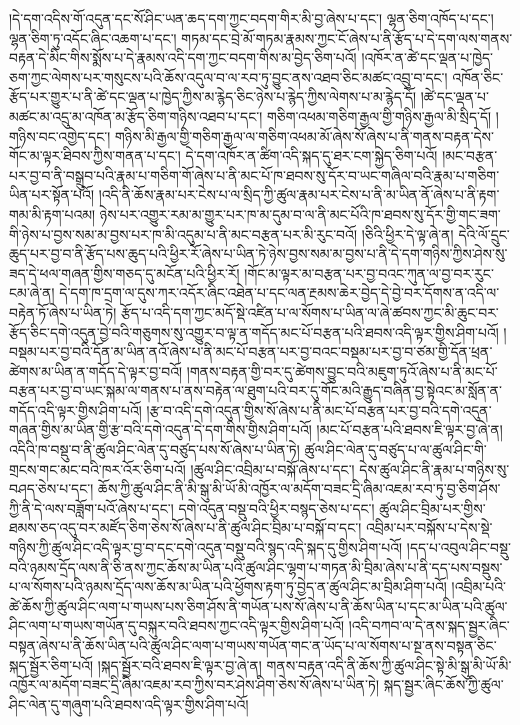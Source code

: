 །དེ་དག་འདིས་གོ་འདུན་དང་སོ་ཤིང་ཡན་ཆད་དག་ཀྱང་བདག་གིར་མི་བྱ་ཞེས་པ་དང་། ལྷན་ཅིག་འཁོད་པ་དང་། ལྷན་ཅིག་ཏུ་འདོང་ཞིང་འཆག་པ་དང་། གཏམ་དང་བྲེ་མོ་གཏམ་རྣམས་ཀྱང་ངོ་ཞེས་པ་ནི་རྩོད་པ་དེ་དག་ལས་གནས་བརྟན་དེ་མིང་གིས་སྨོས་པ་དེ་རྣམས་འདི་དག་ཀྱང་བདག་གིས་མ་བྱེད་ཅིག་པའོ། །འཁོར་ན་ཚེ་དང་ལྡན་པ་ཁྱེད་ཅག་ཀྱང་ལེགས་པར་གསུངས་པའི་ཆོས་འདུལ་བ་ལ་རབ་ཏུ་བྱུང་ནས་འཐབ་ཅིང་མཚང་འབྲུ་བ་དང་། འཁོན་ཅིང་རྩོད་པར་གྱུར་པ་ནི་ཚེ་དང་ལྡན་པ་ཁྱེད་ཀྱིས་མ་རྙེད་ཅིང་ཉེས་པ་རྙེད་ཀྱིས་ལེགས་པ་མ་རྙེད་དོ། །ཚེ་དང་ལྡན་པ་མཚང་མ་འདྲུ་མ་འཁོན་མ་རྩོད་ཅིག་གཉིས་འཐབ་པ་དང་། གཅིག་འཕམ་གཅིག་རྒྱལ་གྱི་གཉིས་རྒྱལ་མི་སྲིད་དོ། །གཉིས་བང་འགྱེད་དང་། གཉིས་མི་རྒྱལ་གྱི་གཅིག་རྒྱལ་ལ་གཅིག་འཕམ་མོ་ཞེས་སོ་ཞེས་པ་ནི་གནས་བརྟན་དེས་གོང་མ་ལྟར་ཐིབས་ཀྱིས་གནན་པ་དང་། དེ་དག་འཁོར་ན་ཚིག་འདི་སྐད་དུ་ཐར་ངག་སྐྱེད་ཅིག་པའོ། །མང་བརྩན་པར་བྱ་བ་ནི་བསྒྲུབ་པའི་རྣམ་པ་གཅིག་གོ་ཞེས་པ་ནི་མང་པོ་ཁ་ཐབས་སུ་དོར་བ་ཡང་གཞིལ་བའི་རྣམ་པ་གཅིག་ཡིན་པར་སྟོན་པའོ། །འདི་ནི་ཆོས་རྣམ་པར་ངེས་པ་ལ་སྲིད་ཀྱི་ཚུལ་རྣམ་པར་ངེས་པ་ནི་མ་ཡིན་ནོ་ཞེས་པ་ནི་རྟག་གམ་མི་རྟག་པའམ། ཉེས་པར་འགྱུར་རམ་མ་གྱུར་པར་ཁ་མ་དུམ་བ་ལ་ནི་མང་པོའི་ཁ་ཐབས་སུ་དོར་གྱི་གང་ཟག་གི་ཉེས་པ་བྱས་སམ་མ་བྱས་པར་ཁ་མི་འདུམ་པ་ནི་མང་བརྩན་པར་མི་རུང་བའོ། །ཅིའི་ཕྱིར་དེ་ལྟ་ཞེ་ན། དེའི་ལོ་དྲུང་ཆུད་པར་བྱ་བ་ནི་རྩོད་པས་ཆུད་པའི་ཕྱིར་རོ་ཞེས་པ་ཡིན་ཏེ་ཉེས་བྱས་སམ་མ་བྱས་པ་ནི་དེ་དག་གཉིས་ཀྱིས་ཤེས་སུ་ཟད་དེ་ཕལ་གཞན་གྱིས་གཅད་དུ་མངོན་པའི་ཕྱིར་རོ། །གོང་མ་ལྟར་མ་བརྩན་པར་བྱ་བའང་ཀུན་ལ་བྱ་བར་རུང་ངམ་ཞེ་ན། དེ་དག་ཁ་དྲག་ལ་དུས་ཀར་འདོར་ཞིང་འཐེན་པ་དང་ལན་རྔམས་ཆེར་བྱེད་དེ་བྱེ་བར་དོགས་ན་འདི་ལ་བརྟེན་ཏོ་ཞེས་པ་ཡིན་ཏེ། རྩོད་པ་འདི་དག་ཀྱང་མདོ་སྡེ་འཛིན་པ་ལ་སོགས་པ་ཡིན་ལ་ཞེ་ཚབས་ཀྱང་མི་ཆུང་བར་རྩོད་ཅིང་དགེ་འདུན་བྱེ་བའི་གཅུགས་སུ་འགྱུར་བ་ལྟ་ན་གདོད་མང་པོ་བརྩན་པའི་ཐབས་འདི་ལྟར་གྱིས་ཤིག་པའོ། །བསྡམ་པར་བྱ་བའི་དོན་མ་ཡིན་ནའོ་ཞེས་པ་ནི་མང་པོ་བརྩན་པར་བྱ་བའང་བསྡམ་པར་བྱ་བ་ཙམ་གྱི་དོན་ཕྲན་ཚེགས་མ་ཡིན་ན་གདོད་དེ་ལྟར་བྱ་བའོ། །གནས་བརྟན་གྱི་བར་དུ་ཚེགས་བྱུང་བའི་མཇུག་ཏུའོ་ཞེས་པ་ནི་མང་པོ་བརྩན་པར་བྱ་བ་ཡང་སྐམ་ལ་གནས་པ་ནས་བརྟེན་ལ་ཐུག་པའི་བར་དུ་གོང་མའི་རྒྱུད་བཞིན་བྱ་སྟེའང་མ་སློན་ན་གདོད་འདི་ལྟར་གྱིས་ཤིག་པའོ། །རྩ་བ་འདི་དགེ་འདུན་གྱིས་སོ་ཞེས་པ་ནི་མང་པོ་བརྩན་པར་བྱ་བའི་དགེ་འདུན་གཞན་གྱིས་མ་ཡིན་གྱི་རྩ་བའི་དགེ་འདུན་དེ་དག་གིས་གྱིས་ཤིག་པའོ། །མང་པོ་བརྩན་པའི་ཐབས་ཇི་ལྟར་བྱ་ཞེ་ན། འདིའི་ཁ་བསྡུ་བ་ནི་ཚུལ་ཤིང་ལེན་དུ་བཙུད་པས་སོ་ཞེས་པ་ཡིན་ཏེ། ཚུལ་ཤིང་ལེན་དུ་བཙུད་པ་ལ་ཚུལ་ཤིང་གི་གྲངས་གང་མང་བའི་ཁར་འོར་ཅིག་པའོ། །ཚུལ་ཤིང་འབྲིམ་པ་བསྐོ་ཞེས་པ་དང་། དེས་ཚུལ་ཤིང་ནི་རྣམ་པ་གཉིས་སུ་བཤད་ཅེས་པ་དང་། ཆོས་ཀྱི་ཚུལ་ཤིང་ནི་མི་སྒུ་མི་ཡོ་མི་འཁྱོར་ལ་མདོག་བཟང་དྲི་ཞིམ་འཇམ་རབ་ཏུ་བྱ་ཅིག་ཤོས་ཀྱི་ནི་དེ་ལས་བཟློག་པའོ་ཞེས་པ་དང་། དགེ་འདུན་བསྡུ་བའི་ཕྱིར་བསྙད་ཅེས་པ་དང་། ཚུལ་ཤིང་བྲིམ་པར་གྱིས་ཐམས་ཅད་འདུ་བར་མཛོད་ཅིག་ཅེས་སོ་ཞེས་པ་ནི་ཚུལ་ཤིང་བྲིམ་པ་བསྐོ་བ་དང་། འབྲིམ་པར་བསྐོས་པ་དེས་སྡེ་གཉིས་ཀྱི་ཚུལ་ཤིང་འདི་ལྟར་བྱ་བ་དང་དགེ་འདུན་བསྡུ་བའི་སྙད་འདི་སྐད་དུ་གྱིས་ཤིག་པའོ། །དད་པ་འབུལ་ཤིང་བསྡུ་བའི་ཉམས་དྲོད་ལས་ནི་ཅི་ནས་ཀྱང་ཆོས་མ་ཡིན་པའི་ཚུལ་ཤིང་ལྷག་པ་གཏན་མི་བྲིམ་ཞེས་པ་ནི་དད་པས་བསྡུས་པ་ལ་སོགས་པའི་ཉམས་དྲོད་ལས་ཆོས་མ་ཡིན་པའི་ཕྱོགས་རྟག་ཏུ་བྱེད་ན་ཚུལ་ཤིང་མ་བྲིམ་ཤིག་པའོ། །འབྲིམ་པའི་ཚེ་ཆོས་ཀྱི་ཚུལ་ཤིང་ལག་པ་གཡས་པས་ཅིག་ཤོས་ནི་གཡོན་པས་སོ་ཞེས་པ་ནི་ཆོས་ཡིན་པ་དང་མ་ཡིན་པའི་ཚུལ་ཤིང་ལག་པ་གཡས་གཡོན་དུ་བསྐུར་བའི་ཐབས་ཀྱང་འདི་ལྟར་གྱིས་ཤིག་པའོ། །འདི་བཀབ་ལ་དེ་ནས་སྐད་སྦྱར་ཞིང་བསྟན་ཞེས་པ་ནི་ཆོས་ཡིན་པའི་ཚུལ་ཤིང་ལག་པ་གཡས་གཡོན་གང་ན་ཡོད་པ་ལ་སོགས་པ་སྔ་ནས་བསྟན་ཅིང་སྐད་སྦྱོར་ཅིག་པའོ། །སྐད་སྦྱོར་བའི་ཐབས་ཇི་ལྟར་བྱ་ཞེ་ན། གནས་བརྟན་འདི་ནི་ཆོས་ཀྱི་ཚུལ་ཤིང་སྟེ་མི་སྒུ་མི་ཡོ་མི་འཁྱོར་ལ་མདོག་བཟང་དྲི་ཞིམ་འཇམ་རབ་ཀྱིས་བར་ཤེས་ཤིག་ཅེས་སོ་ཞེས་པ་ཡིན་ཏེ། སྐད་སྦྱར་ཞིང་ཆོས་ཀྱི་ཚུལ་ཤིང་ལེན་དུ་གཞུག་པའི་ཐབས་འདི་ལྟར་གྱིས་ཤིག་པའོ། 